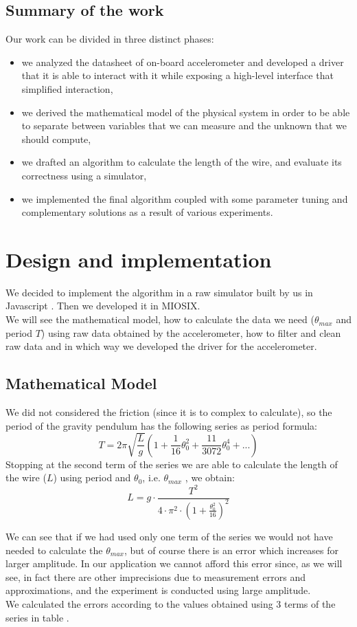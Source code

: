 \subsection{Summary of the work}
Our work can be divided in three distinct phases:
\begin{itemize}
	\item we analyzed the datasheet of on-board accelerometer and developed a driver that it is able to interact with it while exposing a high-level interface that simplified interaction,
	\item we derived the mathematical model of the physical system in order to be able to separate between variables that we can measure and the unknown that we should compute,
	\item we drafted an algorithm to calculate the length of the wire, and evaluate its correctness using a simulator,
	\item we implemented the final algorithm coupled with some parameter tuning and complementary solutions as a result of various experiments. 
\end{itemize}
\pagebreak

\section{Design and implementation}
We decided to implement the algorithm in a raw simulator built by us in Javascript \cite{javascriptPrototype}. Then we developed it in MIOSIX.\\
We will see the mathematical model, how to calculate the data we need ($\theta_{max}$ and period $T$) using raw data obtained by the accelerometer, how to filter and clean raw data and in which way we developed the driver for the accelerometer.

\subsection{Mathematical Model}
We did not considered the friction (since it is to complex to calculate), so the period of the gravity pendulum has the following series as period formula: 
$$T = 2 \pi \sqrt{\frac{L}{g}} \left(1 + \frac{1}{16} \theta_0^2 + \frac{11}{3072} \theta_0^4 + ...\right)$$
Stopping at the second term of the series we are able to calculate the length of the wire ($L$) using period and $\theta_0$, i.e. $\theta_{max}$ , we obtain:
$$ L = g \cdot \frac{T^2}{4 \cdot \pi^2 \cdot \left(1 + \frac{\theta_0^2}{16}\right)^2}$$
\par
We can see that if we had used only one term of the series we would not have needed to calculate the $\theta_{max}$, but of course there is an error which increases for larger amplitude. In our application we cannot afford this error since, as we will see, in fact there are other imprecisions due to measurement errors and approximations, and the experiment is conducted using large amplitude.\\
We calculated the errors according to the values obtained using 3 terms of the series in table .  

